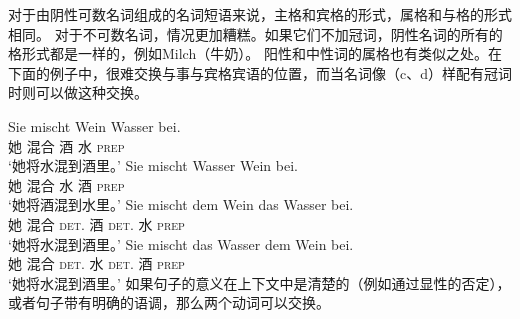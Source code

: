 对于由阴性可数名词组成的名词短语来说，主格和宾格的形式，属格和与格的形式相同。
对于不可数名词，情况更加糟糕。如果它们不加冠词，阴性名词的所有的格形式都是一样的，例如Milch（牛奶）。
阳性和中性词的属格也有类似之处。在下面\citet[]{Wegener85b}的例子中，很难交换与事与宾格宾语的位置，而当名词像（c、d）样配有冠词时则可以做这种交换。

\eal
\ex 
\gll Sie mischt Wein Wasser bei.\\
     她 混合 酒 水 \textsc{prep} \\
\glt `她将水混到酒里。'
\ex 
\gll Sie mischt Wasser Wein bei.\\
     她 混合 水 酒 \textsc{prep} \\
\glt `她将酒混到水里。'
\ex 
\gll Sie mischt dem Wein das Wasser bei.\\
     她 混合 \textsc{det}.\dat{} 酒 \textsc{det}.\acc{} 水 \textsc{prep} \\ 
\glt `她将水混到酒里。'
\ex 
\gll Sie mischt das Wasser dem Wein bei.\\
     她 混合 \textsc{det}.\acc{} 水 \textsc{det}.\dat{} 酒 \textsc{prep} \\ 
\glt `她将水混到酒里。'
\zl
如果句子的意义在上下文中是清楚的（例如通过显性的否定），或者句子带有明确的语调，那么两个动词可以交换。

